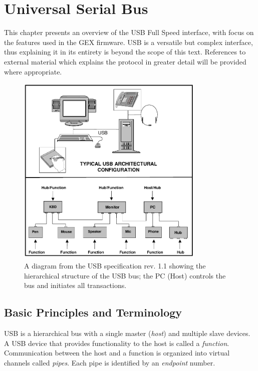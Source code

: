 \chapter{Universal Serial Bus}

This chapter presents an overview of the \gls{USB} Full Speed interface, with focus on the features used in the GEX firmware. \gls{USB} is a versatile but complex interface, thus explaining it in its entirety is beyond the scope of this text. References to external material which explains the protocol in greater detail will be provided where appropriate.

\begin{figure}[H]
	\centering
	\includegraphics[width=0.8\textwidth] {img/usb-hierarchy.png}
	\caption[USB hierarchical structure]{\label{fig:usb-hierarchy}A diagram from the USB specification rev. 1.1 showing the hierarchical structure of the USB bus; the PC (Host) controls the bus and initiates all transactions.}
\end{figure}

\section{Basic Principles and Terminology}


\gls{USB} is a hierarchical bus with a single master (\textit{host}) and multiple slave devices. A \gls{USB} device that provides functionality to the host is called a \textit{function}. Communication between the host and a function is organized into virtual channels called \textit{pipes}. Each pipe is identified by an \textit{endpoint} number.

